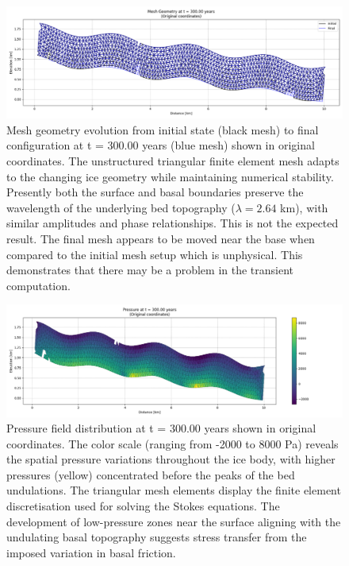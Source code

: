 \begin{figure}
    \includegraphics[scale=0.45]{overlap_xz.png}
    \caption{Mesh geometry evolution from initial state (black mesh) to final configuration at t = 300.00 years (blue mesh) shown in original coordinates. The unstructured triangular finite element mesh adapts to the changing ice geometry while maintaining numerical stability. Presently both the surface and basal boundaries preserve the wavelength of the underlying bed topography ($\lambda = 2.64$ km), with similar amplitudes and phase relationships. This is not the expected result. The final mesh appears to be moved near the base when compared to the initial mesh setup which is unphysical. This demonstrates that there may be a problem in the transient computation.}
    \label{fig:}
\end{figure}

\begin{figure}
    \includegraphics[scale=0.45]{Pressure_300yrs_xz.png}
    \caption{Pressure field distribution at t = 300.00 years shown in original coordinates. The color scale (ranging from -2000 to 8000 Pa) reveals the spatial pressure variations throughout the ice body, with higher pressures (yellow) concentrated before the peaks of the bed undulations. The triangular mesh elements display the finite element discretisation used for solving the Stokes equations. The development of low-pressure zones near the surface aligning with the undulating basal topography suggests stress transfer from the imposed variation in basal friction.}
    \label{fig:}
\end{figure}

